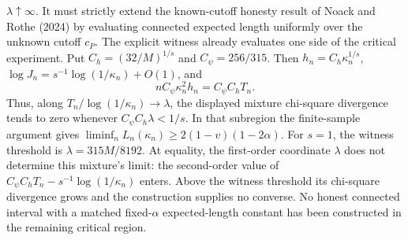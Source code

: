 \(\lambda\uparrow\infty\).  It must strictly extend the known-cutoff
honesty result of Noack and Rothe (2024) by evaluating connected
expected length uniformly over the unknown cutoff \(c_P\).
The explicit witness already evaluates one side of the critical experiment.  Put \(C_h=(32/M)^{1/s}\) and \(C_\psi=256/315\).  Then \(h_n=C_h\kappa_n^{1/s}\), \(\log J_n=s^{-1}\log(1/\kappa_n)+O(1)\), and
\[
nC_\psi\kappa_n^2h_n=C_\psi C_hT_n.
\]
Thus, along \(T_n/\log(1/\kappa_n)\to\lambda\), the displayed mixture chi-square divergence tends to zero whenever \(C_\psi C_h\lambda<1/s\).  In that subregion the finite-sample argument gives \(\liminf_nL_n(\kappa_n)\ge2(1-v)(1-2\alpha)\).  For \(s=1\), the witness threshold is \(\lambda=315M/8192\).  At equality, the first-order coordinate \(\lambda\) does not determine this mixture's limit: the second-order value of \(C_\psi C_hT_n-s^{-1}\log(1/\kappa_n)\) enters.  Above the witness threshold its chi-square divergence grows and the construction supplies no converse.  No honest connected interval with a matched fixed-\(\alpha\) expected-length constant has been constructed in the remaining critical region.
